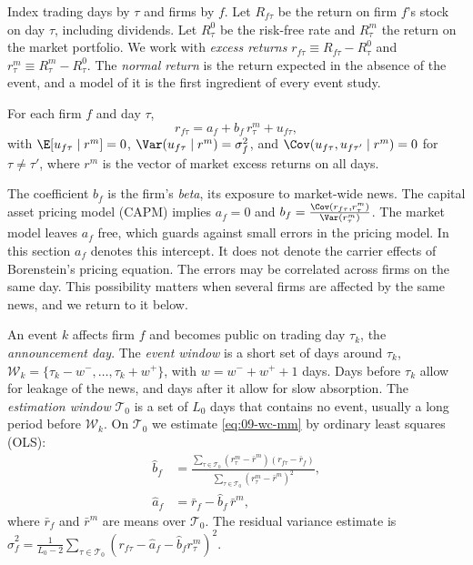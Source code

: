 Index trading days by $\tau$ and firms by $f$. Let $R_{f\tau}$ be the return on firm $f$'s stock on
day $\tau$, including dividends. Let $R^0_\tau$ be the risk-free rate and $R^m_\tau$ the return on the
market portfolio. We work with \emph{excess returns} $r_{f\tau}\equiv R_{f\tau}-R^0_\tau$ and
$r^m_\tau\equiv R^m_\tau-R^0_\tau$. The \emph{normal return} is the return expected in the absence of
the event, and a model of it is the first ingredient of every event study.

\begin{assumption}\label{ass:09-wc-mm}
For each firm $f$ and day $\tau$,
\begin{equation}\label{eq:09-wc-mm}
r_{f\tau} = a_f + b_f\, r^m_\tau + u_{f\tau},
\end{equation}
with $\E[u_{f\tau}\mid r^m]=0$, $\Var(u_{f\tau}\mid r^m)=\sigma_f^2$, and
$\Cov(u_{f\tau},u_{f\tau'}\mid r^m)=0$ for $\tau\neq\tau'$, where $r^m$ is the vector of market
excess returns on all days.
\end{assumption}

The coefficient $b_f$ is the firm's \emph{beta}, its exposure to market-wide news. The capital asset
pricing model (CAPM) implies $a_f=0$ and $b_f=\frac{\Cov(r_{f\tau},r^m_\tau)}{\Var(r^m_\tau)}$. The
market model leaves $a_f$ free, which guards against small errors in the pricing model. In this section
$a_f$ denotes this intercept. It does not denote the carrier effects of Borenstein's pricing equation. The errors may
be correlated across firms on the same day. This possibility matters when several firms are affected by
the same news, and we return to it below.

An event $k$ affects firm $f$ and becomes public on trading day $\tau_k$, the \emph{announcement
day}. The \emph{event window} is a short set of days around $\tau_k$,
$\mathcal{W}_k=\{\tau_k-w^-,\dots,\tau_k+w^+\}$, with $w=w^-+w^++1$ days. Days before
$\tau_k$ allow for leakage of the news, and days after it allow for slow absorption. The
\emph{estimation window} $\mathcal{T}_0$ is a set of $L_0$ days that contains no event, usually a
long period before $\mathcal{W}_k$. On $\mathcal{T}_0$ we estimate \eqref{eq:09-wc-mm} by ordinary
least squares (OLS):
\begin{align*}
\hat b_f &= \frac{\sum_{\tau\in\mathcal{T}_0}(r^m_\tau-\bar r^m)(r_{f\tau}-\bar r_f)}
                 {\sum_{\tau\in\mathcal{T}_0}(r^m_\tau-\bar r^m)^2},\\
\hat a_f &= \bar r_f-\hat b_f\,\bar r^m,
\end{align*}
where $\bar r_f$ and $\bar r^m$ are means over $\mathcal{T}_0$. The residual variance estimate is
$\hat\sigma_f^2=\frac{1}{L_0-2}\sum_{\tau\in\mathcal{T}_0}(r_{f\tau}-\hat a_f-\hat b_f r^m_\tau)^2$.

